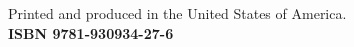 \begin{minipage}[t][1.0cm][b]{\textwidth}
\begin{center}
Printed and produced in the United States of America.\\
\bf{ISBN 9781-930934-27-6}
\end{center}
\end{minipage}
